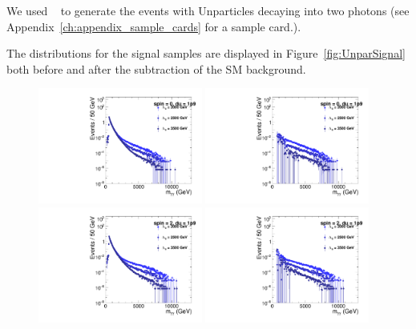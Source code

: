 
We used ~\cite{Sjostrand:2008za} to generate the events with Unparticles decaying into two photons (see Appendix~\ref{ch:appendix_sample_cards} for a sample \PYTHIA card.).

The \mgg distributions for the signal samples are displayed in Figure~\ref{fig:UnparSignal} both before and after the subtraction of the SM background. 


\begin{figure}[tbp!]
\begin{center}
\includegraphics[angle=0,width=0.48\textwidth]{fig/UnparToGG_Spin0_du1p9_TuneCP2_13TeV_pythia8_2018.pdf}
\includegraphics[angle=0,width=0.48\textwidth]{fig/UnparToGG_Spin0_du1p9_TuneCP2_13TeV_pythia8_2018_bkg_sub.pdf}
\includegraphics[angle=0,width=0.48\textwidth]{fig/UnparToGG_Spin2_du1p9_TuneCP2_13TeV_pythia8_2018.pdf}
\includegraphics[angle=0,width=0.48\textwidth]{fig/UnparToGG_Spin2_du1p9_TuneCP2_13TeV_pythia8_2018_bkg_sub.pdf}

\end{center}
\end{figure}
